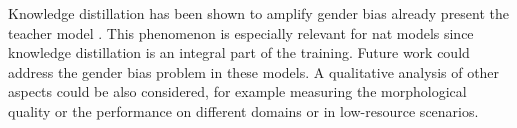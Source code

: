 Knowledge distillation has been shown to amplify gender bias already present
the teacher model \citep{vamvas-sennrich-2021-contrastive}. This phenomenon is
especially relevant for \acs{nat} models since knowledge distillation is an
integral part of the training. Future work could address the gender bias
problem in these models. A qualitative analysis of other aspects could be also
considered, for example measuring the morphological quality or the performance
on different domains or in low-resource scenarios.

